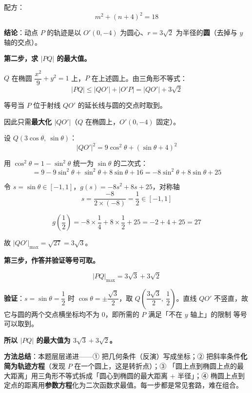\begin{answer}
配方：
\nopagebreak[4]
\[m^2+(n+4)^2=18\]

\textbf{结论}：动点 $P$ 的轨迹是以 $O'(0,-4)$ 为圆心、$r=3\sqrt2$ 为半径的\textbf{圆}（去掉与 $y$ 轴的交点）。

\textbf{第二步，求 $|PQ|$ 的最大值。}

$Q$ 在椭圆 $\dfrac{x^2}{9}+y^2=1$ 上，$P$ 在上述圆上。由三角形不等式：
\nopagebreak[4]
\[|PQ|\le|QO'|+|O'P|=|QO'|+3\sqrt2\]

等号当 $P$ 位于射线 $QO'$ 的延长线与圆的交点时取到。

因此只需\textbf{最大化 $|QO'|$}（$Q$ 在椭圆上，$O'(0,-4)$ 固定）。

设 $Q\left(3\cos\theta,\ \sin\theta\right)$：
\nopagebreak[4]
\[|QO'|^2=9\cos^2\theta+(\sin\theta+4)^2\]

用 $\cos^2\theta=1-\sin^2\theta$ 统一为 $\sin\theta$ 的二次式：
\nopagebreak[4]
\[=9-9\sin^2\theta+\sin^2\theta+8\sin\theta+16=-8\sin^2\theta+8\sin\theta+25\]

令 $s=\sin\theta\in[-1,1]$，$g(s)=-8s^2+8s+25$，对称轴
\nopagebreak[4]
\[s=\frac{-8}{2\times(-8)}=\frac12\in[-1,1]\]

\nopagebreak[4]
\[g\left(\frac12\right)=-8\times\frac14+8\times\frac12+25=-2+4+25=27\]

故 $|QO'|_{\max}=\sqrt{27}=3\sqrt3$。

\textbf{第三步，作答并验证等号可取。}

\nopagebreak[4]
\[|PQ|_{\max}=3\sqrt3+3\sqrt2\]

\textbf{验证}：$s=\sin\theta=\dfrac12$ 时 $\cos\theta=\pm\dfrac{\sqrt3}{2}$，取 $Q\left(\dfrac{3\sqrt3}{2},\ \dfrac12\right)$。直线 $QO'$ 不竖直，故它与圆的两个交点横坐标均不为 $0$，即所需的 $P$ 满足「不在 $y$ 轴上」的限制  等号可以取到。

\textbf{所以 $|PQ|$ 的最大值为 $3\sqrt3+3\sqrt2$。}

\begin{gktip}
\textbf{方法总结}：本题层层递进——① 把几何条件（反演）写成坐标；② 把斜率条件\textbf{化简为轨迹方程}（发现 $P$ 在一个圆上，这是转折点）；③ 「圆上点到椭圆上点的最大距离」用三角形不等式拆成「圆心到椭圆的最大距离 $+$ 半径」；④ 椭圆上点到定点的距离用\textbf{参数方程}化为二次函数求最值。每一步都是常见套路，难在组合。
\end{gktip}



\par\medskip

\end{answer}
